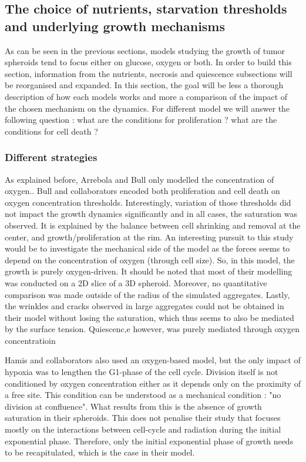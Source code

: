 \documentclass[11pt,a4paper]{article}
\begin{document}
\subsection{The choice of nutrients, starvation thresholds and underlying growth mechanisms}
As can be seen in the previous sections, models studying the growth of tumor spheroids tend to focus either on glucose, oxygen or both. In order to build this section, information from the nutrients,  necrosis and quiescence subsections will be reorganised and expanded. In this section, the goal will be less a thorough description of how each models works and more a comparison of the impact of the chosen mechanism on the dynamics. For different model we will answer the following question : what are the conditions for proliferation ? what are the conditions for cell death ?

\subsubsection{Different strategies}
As explained before, Arrebola and Bull only modelled the concentration of oxygen.\cite{Arrebola2020}\cite{Bull2020}. Bull and collaborators encoded both proliferation and cell death on oxygen concentration thresholds.\cite{Bull2020} Interestingly, variation of those thresholds did not impact the growth dynamics significantly and in all cases, the saturation was observed. It is explained by the balance between cell shrinking and removal at the center, and growth/proliferation at the rim. An interesting pursuit to this study would be to investigate the mechanical side of the model as the forces seems to depend on the concentration of oxygen (through cell size). So, in this model, the growth is purely oxygen-driven. It should be noted that most of their modelling was conducted on a 2D slice of a 3D spheroid. Moreover, no quantitative comparison was made outside of the radius of the simulated aggregates. Lastly, the wrinkles and cracks observed in large aggregates could not be obtained in their model without losing the saturation, which thus seems to also be mediated by the surface tension. Quiescenc,e however, was purely mediated through oxygen concentratioin

Hamis and collaborators also used an oxygen-based model, but the only impact of hypoxia was to lengthen the G1-phase of the cell cycle.\cite{Hamis2020} Division itself is not conditioned by oxygen concentration either as it depends only on the proximity of a free site. This condition can be understood as a mechanical condition : "no division at confluence". What results from this is the absence of growth saturation in their spheroids. This does not penalise their study that focuses mostly on the interactions between cell-cycle and radiation during the initial exponential phase. Therefore, only the initial exponential phase of growth needs to be recapitulated, which is the case in their model. 
\end{document}

